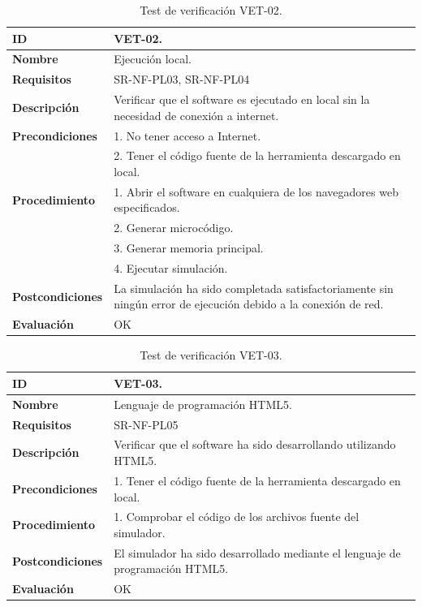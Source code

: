 \begin{center}
\begin{table}[htb]
\centering
\caption{Test de verificación VET-02.}
\begin{tabular}{@{}p{2.5cm} p{13cm}@{}} 
\toprule
\textbf{ID} 					& VET-02. \\
\midrule
\textbf{Nombre} 				& Ejecución local. \\
\midrule
\textbf{Requisitos} 		& SR-NF-PL03, SR-NF-PL04\\
\midrule
\textbf{Descripción} 		& Verificar que el software es ejecutado en local sin la necesidad de conexión a internet. \\
\midrule
\textbf{Precondiciones}		& 1. No tener acceso a Internet.\\
											& 2. Tener el código fuente de la herramienta descargado en local.\\
\midrule
\textbf{Procedimiento}			& 1. Abrir el software en cualquiera de los navegadores web especificados. \\
							& 2. Generar microcódigo.\\
							& 3. Generar memoria principal.\\
							& 4. Ejecutar simulación.\\
\midrule
\textbf{Postcondiciones} 		&  La simulación ha sido completada satisfactoriamente sin ningún error de ejecución debido a la conexión de red.\\
\midrule
\textbf{Evaluación} 			& OK \\
\bottomrule
\end{tabular}
\label{tab:vet02}
\end{table}
\end{center}

\begin{center}
\begin{table}[htb]
\centering
\caption{Test de verificación VET-03.}
\begin{tabular}{@{}p{2.5cm} p{13cm}@{}} 
\toprule
\textbf{ID} 					& VET-03. \\
\midrule
\textbf{Nombre} 				& Lenguaje de programación HTML5. \\
\midrule
\textbf{Requisitos} 		& SR-NF-PL05\\
\midrule
\textbf{Descripción} 		& Verificar que el software ha sido desarrollando utilizando HTML5. \\
\midrule
\textbf{Precondiciones}		& 1. Tener el código fuente de la herramienta descargado en local. \\
\midrule
\textbf{Procedimiento}		& 1. Comprobar el código de los archivos fuente del simulador.\\
\midrule
\textbf{Postcondiciones} 		&  El simulador ha sido desarrollado mediante el lenguaje de programación HTML5.\\
\midrule
\textbf{Evaluación} 			& OK \\
\bottomrule
\end{tabular}
\label{tab:vet03}
\end{table}
\end{center}

